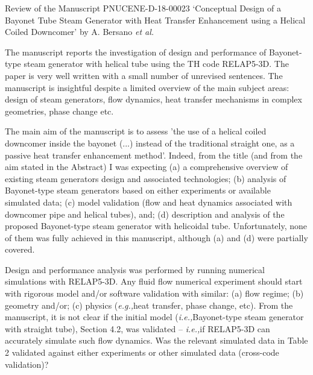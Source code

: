 \documentclass[14pt,twoside]{report}
\newcommand{\ie}{{\it i.e.,}}
\newcommand{\eg}{{\it e.g.,}}
\begin{document}
\afterpage{%
    \clearpage%
    \thispagestyle{empty}%
    \begin{landscape}%
        \centering %
        \vfill
    \end{landscape}
    \clearpage%
}
\vfill 
\clearpage


\begin{center}
  {\Large Review of the Manuscript PNUCENE-D-18-00023 `Conceptual Design of a Bayonet Tube Steam Generator with Heat Transfer Enhancement using a Helical Coiled Downcomer' by A. Bersano {\it et al.}}
\end{center}

\medskip
The manuscript reports the investigation of design and performance of Bayonet-type steam generator with helical tube using the TH code RELAP5-3D. The paper is very well written with a small number of unrevised sentences. The manuscript is insightful despite a limited overview of the main subject areas: design of steam generators, flow dynamics, heat transfer mechanisms in complex geometries, phase change etc.

The main aim of the manuscript is to assess 'the use of a helical coiled downcomer inside the bayonet (...) instead of the traditional straight one, as a passive heat transfer enhancement method'. Indeed, from the title (and from the aim stated in the Abstract) I was expecting (a) a comprehensive overview of existing steam generators design and associated technologies; (b) analysis of Bayonet-type steam generators based on either experiments or available simulated data; (c) model validation (flow and heat dynamics associated with downcomer pipe and helical tubes), and; (d) description and analysis of the proposed Bayonet-type steam generator with helicoidal tube. Unfortunately, none of them was fully achieved in this manuscript, although (a) and (d) were partially covered.

Design and performance analysis was performed by running numerical simulations with RELAP5-3D. Any fluid flow numerical experiment should start with rigorous model and/or software validation with similar: (a) flow regime; (b) geometry and/or; (c) physics (\eg heat transfer, phase change, etc). From the manuscript, it is not clear if the initial model (\ie Bayonet-type steam generator with straight tube), Section 4.2,  was validated -- \ie if RELAP5-3D can accurately simulate such flow dynamics. Was the relevant simulated data in Table 2 validated against either experiments or other simulated data (cross-code validation)?
\end{document}
